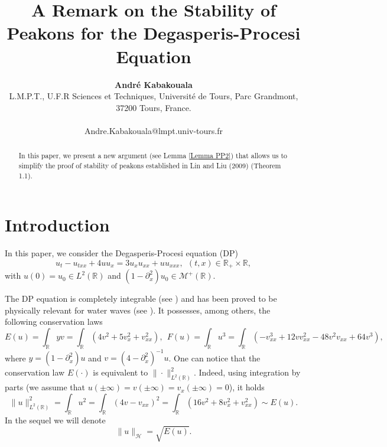 \documentclass[10pt,a4paper,twoside]{article}
\date{}
\title{\textbf{A Remark on the Stability of Peakons for the Degasperis-Procesi Equation}}
\author{\textbf{Andr\'e Kabakouala}\\
L.M.P.T., U.F.R Sciences et Techniques, Universit\'e de Tours, Parc Grandmont,\\
37200 Tours, France.\\
\\
Andre.Kabakouala@lmpt.univ-tours.fr}
\begin{document}
\theoremstyle{plain}
\newtheorem{Theo}{Theorem}[section]
\newtheorem{Pro}{Proposition}[section]
\newtheorem{Lem}{Lemma}[section]
\newtheorem{Cor}{Corollary}[section]
\newtheorem{Def}{Definition}[section]
\newtheorem{Pre}{Proof}
\newtheorem{Rem}{Remark}[section]
\newtheorem{Ex}{Example}[section]
\newtheorem*{Ack}{Acknowledgements}
\newtheorem{Cost}{Construction}[section]



\maketitle



\begin{abstract}
In this paper, we present a new argument (see Lemma \ref{Lemma PP2}) that allows us to simplify the proof of stability of peakons established in Lin and Liu (2009) (Theorem 1.1).
\end{abstract}
\vspace{1cm}









\section{Introduction}
In this paper, we consider the Degasperis-Procesi equation (DP)
\begin{equation}
u_{t}-u_{txx}+4uu_{x}=3u_{x}u_{xx}+uu_{xxx},
~~(t,x)\in\mathbb{R}_{+}\times\mathbb{R},
\label{1.1}
\end{equation}
with $u(0)=u_{0}\in L^{2}(\mathbb{R})$ and $(1-\partial^{2}_{x})u_{0}\in\mathcal{M}^{+}(\mathbb{R})$.



The DP equation is completely integrable (see \cite{MR2001531}) and has been proved to be physically relevant for water waves (see \cite{MR2481064}). It   possesses, among others,  the following conservation laws
\begin{equation}
E(u)=\int_{\mathbb{R}}yv=\int_{\mathbb{R}}\left(4v^{2}+5v^{2}_{x}+v^{2}_{xx}\right),~~
F(u)=\int_{\mathbb{R}}u^{3}=\int_{\mathbb{R}}\left(-v^{3}_{xx}+12vv^{2}_{xx}-48v^{2}v_{xx}+64v^{3}\right),
\label{i}
\end{equation}
where $y=(1-\partial^{2}_{x})u$ and $v=(4-\partial^{2}_{x})^{-1}u$. One can notice that the conservation law 
$E(\cdot)$ is equivalent to $\|\cdot\|^{2}_{L^{2}(\mathbb{R})}$. Indeed, using integration by parts (we assume that $u(\pm\infty)=v(\pm\infty)=v_{x}(\pm\infty)=0$), it holds
\begin{equation}
\|u\|^{2}_{L^{2}(\mathbb{R})}=\int_{\mathbb{R}}u^{2}=\int_{\mathbb{R}}(4v-v_{xx})^{2}
=\int_{\mathbb{R}}\left(16v^{2}+8v^{2}_{x}+v^{2}_{xx}\right)\sim E(u).
\label{1.5}
\end{equation}
In the sequel we will denote 
\begin{equation}
\|u\|_{\mathcal{H}}=\sqrt{E(u)}.
\label{1.5b}
\end{equation}
\end{document}
